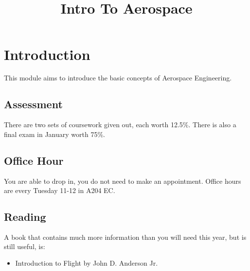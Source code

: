 \documentclass[12pt,a4paper]{article}
\begin{document}
\title{Intro To Aerospace}
\date{}
\maketitle

\newpage

\tableofcontents

\newpage

\section{Introduction}
	
	This module aims to introduce the basic concepts of Aerospace Engineering.

	\subsection{Assessment}
		There are two sets of coursework given out, each worth 12.5\%. There is also a final exam in January worth 75\%.
		
	\subsection{Office Hour}
		You are able to drop in, you do not need to make an appointment. Office hours are every Tuesday 11-12 in A204 EC.
		
	\subsection{Reading}
		A book that contains much more information than you will need this year, but is still useful, is:
		\begin{itemize}
			\item Introduction to Flight by John D. Anderson Jr.
		\end{itemize}
\end{document}
